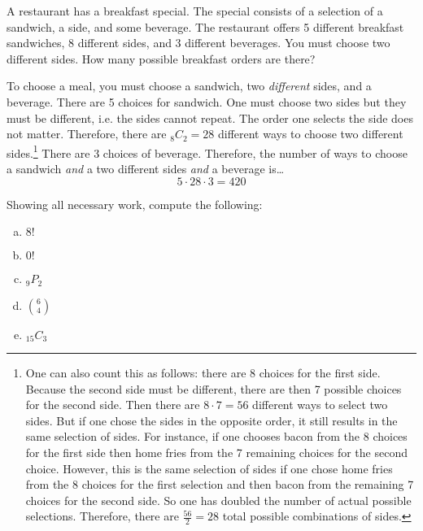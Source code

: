 \documentclass[11pt,letterpaper]{article}
\begin{document}
\newpage



 A restaurant has a breakfast special. The special consists of a selection of a sandwich, a side, and some beverage. The restaurant offers 5 different breakfast sandwiches, 8 different sides, and 3 different beverages. You must choose two different sides. How many possible breakfast orders are there? \pspace

\sol To choose a meal, you must choose a sandwich, two \textit{different} sides, and a beverage. There are 5 choices for sandwich. One must choose two sides but they must be different, i.e. the sides cannot repeat. The order one selects the side does not matter. Therefore, there are $_8C_2= 28$ different ways to choose two different sides.\footnote{One can also count this as follows: there are 8 choices for the first side. Because the second side must be different, there are then 7 possible choices for the second side. Then there are $8 \cdot 7= 56$ different ways to select two sides. But if one chose the sides in the opposite order, it still results in the same selection of sides. For instance, if one chooses bacon from the 8 choices for the first side then home fries from the 7 remaining choices for the second choice. However, this is the same selection of sides if one chose home fries from the 8 choices for the first selection and then bacon from the remaining 7 choices for the second side. So one has doubled the number of actual possible selections. Therefore, there are $\frac{56}{2}= 28$ total possible combinations of sides.} There are 3 choices of beverage. Therefore, the number of ways to choose a sandwich \textit{and} a two different sides \textit{and} a beverage is\dots
	\[
	5 \cdot 28 \cdot 3= 420
	\]



\newpage



 Showing all necessary work, compute the following:
	\begin{enumerate}[(a)]
	\item $8!$
	\item $0!$
	\item $_9P_2$
	\item $\binom{6}{4}$
	\item $_{15}C_3$
	\end{enumerate} \pspace
\end{document}
